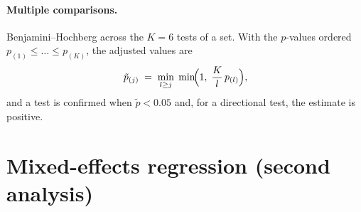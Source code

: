 \documentclass[11pt]{article}
\begin{document}
\paragraph{Multiple comparisons.} Benjamini--Hochberg across the $K = 6$ tests of a set. With the
$p$-values ordered $p_{(1)} \le \dots \le p_{(K)}$, the adjusted values are
\begin{equation}
  \tilde{p}_{(j)} \;=\; \min_{l \ge j} \; \min\!\Bigl(1,\; \frac{K}{l}\, p_{(l)} \Bigr),
\end{equation}
and a test is confirmed when $\tilde{p} < 0.05$ and, for a directional test, the estimate is positive.

\section{Mixed-effects regression (second analysis)}
\end{document}
